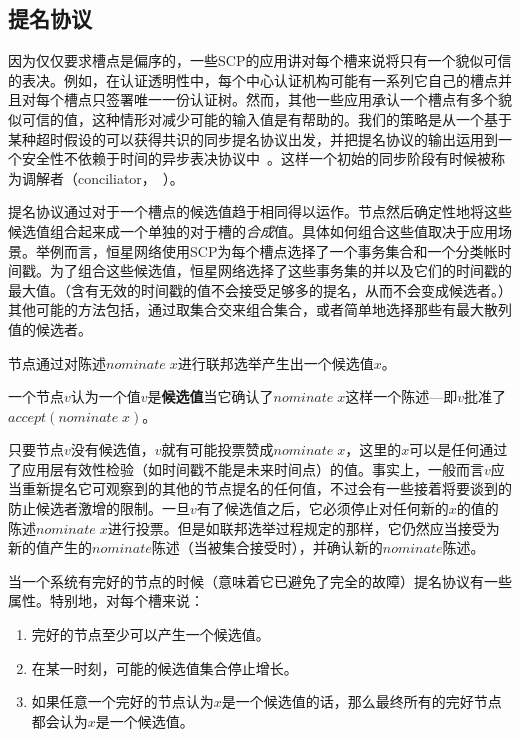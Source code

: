 \subsection{提名协议}

因为仅仅要求槽点是偏序的，一些SCP的应用讲对每个槽来说将只有一个貌似可信的表决。例如，在认证透明性中，每个中心认证机构可能有一系列它自己的槽点并且对每个槽点只签署唯一一份认证树。然而，其他一些应用承认一个槽点有多个貌似可信的值，这种情形对减少可能的输入值是有帮助的。我们的策略是从一个基于某种超时假设的可以获得共识的同步提名协议出发，并把提名协议的输出运用到一个安全性不依赖于时间的异步表决协议中~\cite{Lamport:2011:BAL:2075029.2075043}。这样一个初始的同步阶段有时候被称为调解者（conciliator，~\cite{Aspnes:2010:MAS:1835698.1835802}）。

提名协议通过对于一个槽点的候选值趋于相同得以运作。节点然后确定性地将这些候选值组合起来成一个单独的对于槽的\textit{合成}值。具体如何组合这些值取决于应用场景。举例而言，恒星网络使用SCP为每个槽点选择了一个事务集合和一个分类帐时间戳。为了组合这些候选值，恒星网络选择了这些事务集的并以及它们的时间戳的最大值。（含有无效的时间戳的值不会接受足够多的提名，从而不会变成候选者。）其他可能的方法包括，通过取集合交来组合集合，或者简单地选择那些有最大散列值的候选者。

节点通过对陈述$nominate\;x$进行联邦选举产生出一个候选值$x$。

\begin{definition}[候选的]
	一个节点$v$认为一个值$v$是\textbf{候选值}当它确认了$nominate\;x$这样一个陈述---即$v$批准了$accept(nominate\;x)$。
\end{definition}

只要节点$v$没有候选值，$v$就有可能投票赞成$nominate\;x$，这里的$x$可以是任何通过了应用层有效性检验（如时间戳不能是未来时间点）的值。事实上，一般而言$v$应当重新提名它可观察到的其他的节点提名的任何值，不过会有一些接着将要谈到的防止候选者激增的限制。一旦$v$有了候选值之后，它必须停止对任何新的$x$的值的陈述$nominate\;x$进行投票。但是如联邦选举过程规定的那样，它仍然应当接受为新的值产生的$nominate$陈述（当被{\vblock}集合接受时），并确认新的$nominate$陈述。

当一个系统有完好的节点的时候（意味着它已避免了完全的故障）提名协议有一些属性。特别地，对每个槽来说：
\begin{enumerate}
	\item\label{enum:cand_p1} 完好的节点至少可以产生一个候选值。
	\item\label{enum:cand_p2} 在某一时刻，可能的候选值集合停止增长。
	\item\label{enum:cand_p3} 如果任意一个完好的节点认为$x$是一个候选值的话，那么最终所有的完好节点都会认为$x$是一个候选值。
\end{enumerate}

